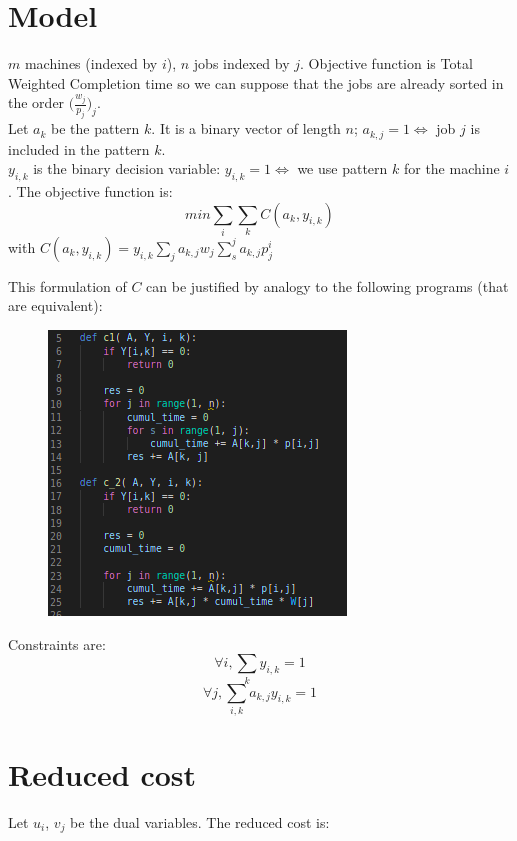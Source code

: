 \documentclass[12pt]{article}
\begin{document}
    \section{Model}
        $m$ machines (indexed by $i$), $n$ jobs indexed by $j$. Objective function is Total Weighted Completion time so we can suppose that the jobs are already sorted in the order $\bigg(\frac{w_j}{p_j}\bigg)_j$.\\
        Let $a_k$ be the pattern $k$. It is a binary vector of length $n$; $a_{k,j} = 1 \Leftrightarrow $ job $j$ is included in the pattern $k$.\\
        $y_{i,k}$ is the binary decision variable: $y_{i,k} = 1 \Leftrightarrow $ we use pattern $k$ for the machine $i$.
        The objective function is: 
        $$ min \sum_i \sum_k C(a_k, y_{i,k}) $$ 
        with $C(a_k, y_{i,k}) = y_{i,k} \sum_j a_{k,j} w_j \sum_s^j a_{k,j} p_j^i $ 

        This formulation of $C$ can be justified by analogy to the following programs (that are equivalent):

        \begin{figure}[H]
            \centering
            \includegraphics[scale = 0.8]{p3_c1_c2.png}
        \end{figure}

        Constraints are:
        $$ \forall i, \sum_k y_{i,k} = 1   $$
        $$ \forall j, \sum_{i, k} a_{k, j} y_{i,k} = 1  $$

    \section{Reduced cost}
        Let $u_i$, $v_j$ be the dual variables.
        The reduced cost is:

        $$ $$
\end{document}
